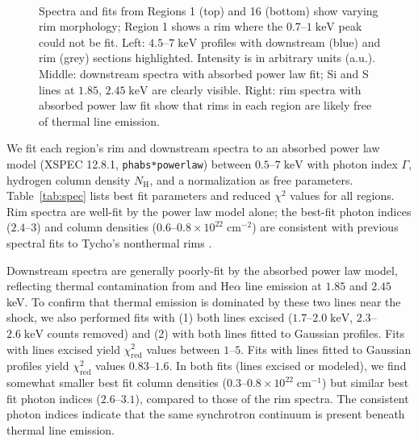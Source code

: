 \documentclass[manuscript]{aastex}  %
\newcommand*{\mt}{\mathrm}
\newcommand*{\unit}[1]{\;\mt{#1}}  %
\begin{document}
\begin{figure*}
    \iftoggle{manuscript}{
        \epsscale{0.7}
    }{}
     \\
    \caption{Spectra and fits from Regions 1 (top) and 16 (bottom) show varying
        rim morphology; Region 1 shows a rim where the $0.7$--$1 \unit{keV}$
        peak could not be fit.  Left: $4.5$--$7 \unit{keV}$ profiles with
        downstream (blue) and rim (grey) sections highlighted.  Intensity is in
        arbitrary units (a.u.).  Middle: downstream spectra with absorbed
        power law fit; Si and S lines at $1.85$, $2.45 \unit{keV}$ are clearly
        visible.  Right: rim spectra with absorbed power law fit show that
        rims in each region are likely free of thermal line emission.}
    \label{fig:spec}
\end{figure*}

We fit each region's rim and downstream spectra to an absorbed power law model
(XSPEC 12.8.1, \texttt{phabs*powerlaw}) between $0.5$--$7 \unit{keV}$ with
photon index $\Gamma$, hydrogen column density $N_{\mt{H}}$, and a
normalization as free parameters.  Table~\ref{tab:spec} lists best fit
parameters and reduced $\chi^2$ values for all regions.  Rim spectra are
well-fit by the power law model alone; the best-fit photon indices ($2.4$--$3$)
and column densities ($0.6$--$0.8 \times 10^{22} \unit{cm^{-2}}$) are
consistent with previous spectral fits to Tycho's nonthermal rims
\citep{hwang2002, cassam-chenai2007}.

Downstream spectra are generally poorly-fit by the absorbed power law model,
reflecting thermal contamination from  and  He$\alpha$
line emission at $1.85$ and $2.45$ keV.  To confirm that thermal emission is
dominated by these two lines near the shock, we also performed fits with (1)
both lines excised ($1.7$--$2.0 \unit{keV}$, $2.3$--$2.6 \unit{keV}$ counts
removed) and (2) with both lines fitted to Gaussian profiles.  Fits with lines
excised yield $\chi^2_{\mt{red}}$ values between $1$--$5$.  Fits with lines
fitted to Gaussian profiles yield $\chi^2_{\mt{red}}$ values $0.83$--$1.6$.  In
both fits (lines excised or modeled), we find somewhat smaller best fit column
densities ($0.3$--$0.8 \times 10^{22} \unit{cm^{-1}}$) but similar best fit
photon indices ($2.6$--$3.1$), compared to those of the rim spectra.  The
consistent photon indices indicate that the same synchrotron continuum is
present beneath thermal line emission.
\end{document}
